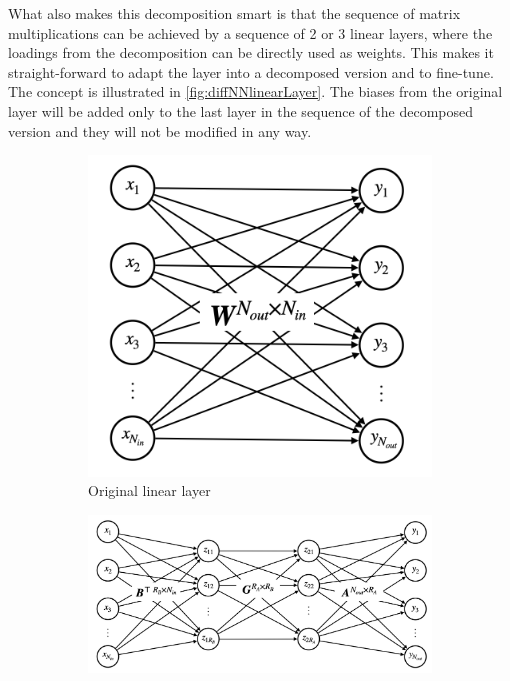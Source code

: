 What also makes this decomposition smart is that the sequence of matrix multiplications can be achieved by a sequence of 2 or 3 linear layers, where the loadings from the decomposition can be directly used as weights. This makes it straight-forward to adapt the layer into a decomposed version and to fine-tune. The concept is illustrated in \autoref{fig:diffNNlinearLayer}. The biases from the original layer will be added only to the last layer in the sequence of the decomposed version and they will not be modified in any way.
\begin{figure}
    \centering
    \begin{subfigure}{0.35\linewidth}
        \centering
        \includegraphics[width=\linewidth]{Pics/05_methodology/NNlinearLayer.png}
        \caption{Original linear layer}
    \end{subfigure}
    \begin{subfigure}{\linewidth}
        \centering
        \includegraphics[width=.75\linewidth]{Pics/05_methodology/NNdecompLinearLayer.png}

\end{subfigure}
\end{figure}
